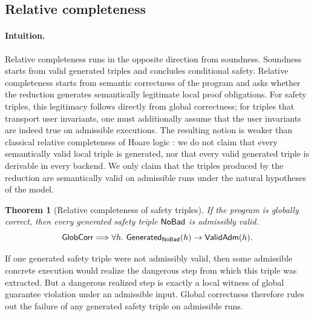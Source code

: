 \documentclass[acmsmall,screen]{acmart}
\theoremstyle{leftplain}
\newtheorem{theorem}{Theorem}
\theoremstyle{leftdefinition}
\theoremstyle{leftremark}
\begin{document}
\subsection{Relative completeness}
\paragraph{Intuition.}
Relative completeness runs in the opposite direction from soundness. Soundness
starts from valid generated triples and concludes conditional safety. Relative
completeness starts from semantic correctness of the program and asks whether
the reduction generates semantically legitimate local proof obligations. For
safety triples, this legitimacy follows directly from global correctness; for
triples that transport user invariants, one must additionally assume that the
user invariants are indeed true on admissible executions. The resulting notion is weaker
than classical relative completeness of Hoare logic
\cite{cook-1978}: we do not claim that every semantically valid local triple is
generated, nor that every valid generated triple is derivable in every
backend. We only claim that the triples produced by the reduction are
semantically valid on admissible runs under the natural hypotheses of the
model.

\begin{theorem}[Relative completeness of safety triples]
\label{thm:rc-nobad}
If the program is globally correct, then
every generated safety triple $\mathsf{NoBad}$ is admissibly valid.
\[
  \mathsf{GlobCorr} \Longrightarrow
  \forall h.\ \mathsf{Generated}_{\mathsf{NoBad}}(h) \rightarrow \mathsf{ValidAdm}(h).
\]
\end{theorem}

\noindent{}
If one generated safety triple were not admissibly valid, then some admissible
concrete execution would realize the dangerous step from which this triple was
extracted. But a dangerous realized step is exactly a local witness of global
guarantee violation under an admissible input. Global correctness therefore
rules out the failure of any generated safety triple on admissible runs.
\end{document}

